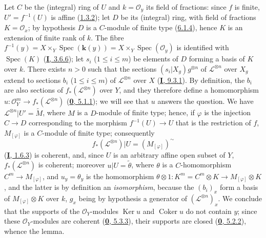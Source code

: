 Let $C$ be the (integral) ring of $U$ and $k=\mathcal{O}_y$ its field of
fractions: since $f$ is finite, $U'=f^{-1}(U)$ is affine
(\hyperref[II.1.3.2]{1.3.2}); let $D$ be its (integral) ring, with field of
fractions $K=\mathcal{O}_x$; by hypothesis $D$ is a $C$-module of finite
type (\hyperref[II.6.1.4]{6.1.4}), hence $K$ is an extension of finite rank
of $k$. The fibre $f^{-1}(y)=X\times_Y\operatorname{Spec}(\boldsymbol{k}(y))=X\times_Y\operatorname{Spec}(\mathcal{O}_y)$
is identified with $\operatorname{Spec}(K)$
(\hyperref[I.3.6.5]{\textbf{I}, 3.6.6}); let $s_i$ ($1\leq i\leq m$) be
elements of $D$ forming a basis of $K$ over $k$. There exists $n>0$ such that
the sections $(s_i|X_g)g^{\otimes n}$ of $\mathcal{L}^{\otimes n}$ over
$X_g$ extend to sections $b_i$ ($1\leq i\leq m$) of
$\mathcal{L}^{\otimes n}$ over $X$
(\hyperref[I.9.3.1]{\textbf{I}, 9.3.1}). By definition, the $b_i$ are also
sections of $f_*(\mathcal{L}^{\otimes n})$ over $Y$, and they therefore
define a homomorphism
$u:\mathcal{O}_Y^m\to f_*(\mathcal{L}^{\otimes n})$
(\hyperref[0.5.1.1]{\textbf{0}, 5.1.1}); we will see that $u$ answers the
question. We have $\mathcal{L}^{\otimes n}|U'=\widetilde{M}$, where $M$ is a
$D$-module of finite type; hence, if $\varphi$ is the injection $C\to D$
corresponding to the morphism $f^{-1}(U)\to U$ that is the restriction of $f$,
$M_{[\varphi]}$ is a $C$-module of finite type; consequently
\[
f_*(\mathcal{L}^{\otimes n})|U=(M_{[\varphi]})^\sim
\]
(\hyperref[I.1.6.3]{\textbf{I}, 1.6.3}) is coherent, and, since $U$ is an arbitrary
affine open subset of $Y$, $f_*(\mathcal{L}^{\otimes n})$ is coherent;
moreover $u|U=\widetilde{\theta}$, where $\theta$ is a $C$-homomorphism
$C^m\to M_{[\varphi]}$, and $u_y=\theta_y$ is the homomorphism $\theta\otimes1:K^m=C^m\otimes K\longrightarrow M_{[\varphi]}\otimes K$,
and the latter is by definition an \emph{isomorphism}, because the $(b_i)_x$
form a basis of $M_{[\varphi]}\otimes K$ over $k$, $g_x$ being by
hypothesis a generator of $(\mathcal{L}^{\otimes n})_x$. We conclude that
the supports of the $\mathcal{O}_Y$-modules $\operatorname{Ker}u$ and
$\operatorname{Coker}u$ do not contain $y$; since these
$\mathcal{O}_Y$-modules are coherent
(\hyperref[0.5.3.3]{\textbf{0}, 5.3.3}), their supports are closed
(\hyperref[0.5.2.2]{\textbf{0}, 5.2.2}), whence the lemma.

